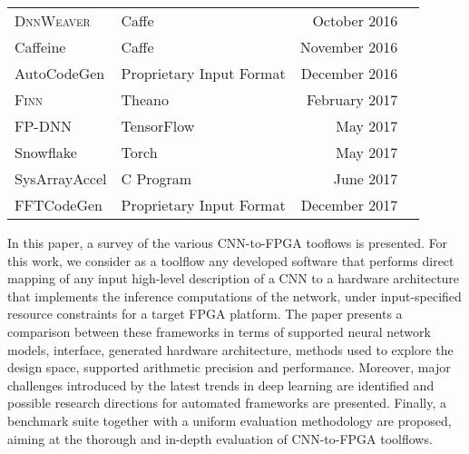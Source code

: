 \documentclass[format=acmsmall, review=false, screen=true]{acmart}
\begin{document}
\begin{table}[t]
{\begin{tabular}{l l r l}
		\textsc{DnnWeaver} \cite{Sharma2016DnnweaverFH}\cite{Sharma_2016}   & Caffe & October 2016 \\ 
		
		Caffeine \cite{Zhang_2016} & Caffe & November 2016 \\
		
		{\color{black}AutoCodeGen \cite{Zhiqiang_Liu_2016}} & {\color{black} Proprietary Input Format} & {\color{black}December 2016} \\
		
		\textsc{Finn} \cite{Umuroglu_2017}\cite{Fraser_2017} & Theano & February 2017 \\
		
		FP-DNN \cite{Guan2017} & TensorFlow & May 2017 \\
		
		{\color{black}Snowflake \cite{Gokhale2017}\cite{Chang_2017}} & {\color{black} Torch} & {\color{black}May 2017} \\
		
		SysArrayAccel \cite{Wei2017} & C Program & June 2017 \\
		
		{\color{black}FFTCodeGen \cite{fft2017fpga}\cite{fftcodegen2017rpt}\cite{fft2017reconfig}\cite{fft2018fpga}} & {\color{black}Proprietary Input Format} & {\color{black}December 2017} \\
		
		\bottomrule
	\end{tabular}%
}
\vspace{-0.1cm}
\end{table}


In this paper, a survey of the various CNN-to-FPGA tooflows is presented. For this work, we consider as a toolflow any developed software that performs direct mapping of any input high-level description of a CNN %
to a hardware architecture that implements the inference computations of the network, under input-specified resource constraints for a target FPGA platform. The paper presents a comparison between these frameworks in terms of supported neural network models, interface, generated hardware architecture, methods used to explore the design space, supported arithmetic precision and performance. Moreover, major challenges introduced by the latest trends in deep learning are identified and possible research directions for automated frameworks are presented. Finally, a benchmark suite together with a uniform evaluation methodology are proposed, aiming at the thorough and in-depth evaluation of CNN-to-FPGA toolflows.
\end{document}
